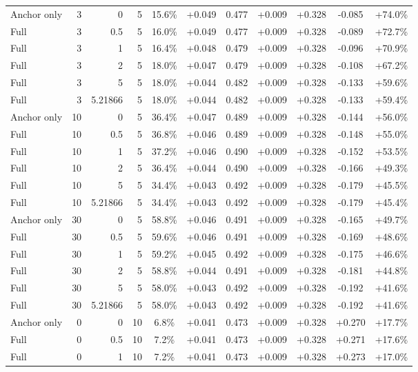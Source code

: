 \begin{table}[htbp]
\begin{tabular}{lrrrccccccc}
Anchor only & 3 & 0 & 5 & 15.6\% & +0.049 & 0.477 & +0.009 & +0.328 & -0.085 & +74.0\% \\
Full & 3 & 0.5 & 5 & 16.0\% & +0.049 & 0.477 & +0.009 & +0.328 & -0.089 & +72.7\% \\
Full & 3 & 1 & 5 & 16.4\% & +0.048 & 0.479 & +0.009 & +0.328 & -0.096 & +70.9\% \\
Full & 3 & 2 & 5 & 18.0\% & +0.047 & 0.479 & +0.009 & +0.328 & -0.108 & +67.2\% \\
Full & 3 & 5 & 5 & 18.0\% & +0.044 & 0.482 & +0.009 & +0.328 & -0.133 & +59.6\% \\
Full & 3 & 5.21866 & 5 & 18.0\% & +0.044 & 0.482 & +0.009 & +0.328 & -0.133 & +59.4\% \\
Anchor only & 10 & 0 & 5 & 36.4\% & +0.047 & 0.489 & +0.009 & +0.328 & -0.144 & +56.0\% \\
Full & 10 & 0.5 & 5 & 36.8\% & +0.046 & 0.489 & +0.009 & +0.328 & -0.148 & +55.0\% \\
Full & 10 & 1 & 5 & 37.2\% & +0.046 & 0.490 & +0.009 & +0.328 & -0.152 & +53.5\% \\
Full & 10 & 2 & 5 & 36.4\% & +0.044 & 0.490 & +0.009 & +0.328 & -0.166 & +49.3\% \\
Full & 10 & 5 & 5 & 34.4\% & +0.043 & 0.492 & +0.009 & +0.328 & -0.179 & +45.5\% \\
Full & 10 & 5.21866 & 5 & 34.4\% & +0.043 & 0.492 & +0.009 & +0.328 & -0.179 & +45.4\% \\
Anchor only & 30 & 0 & 5 & 58.8\% & +0.046 & 0.491 & +0.009 & +0.328 & -0.165 & +49.7\% \\
Full & 30 & 0.5 & 5 & 59.6\% & +0.046 & 0.491 & +0.009 & +0.328 & -0.169 & +48.6\% \\
Full & 30 & 1 & 5 & 59.2\% & +0.045 & 0.492 & +0.009 & +0.328 & -0.175 & +46.6\% \\
Full & 30 & 2 & 5 & 58.8\% & +0.044 & 0.491 & +0.009 & +0.328 & -0.181 & +44.8\% \\
Full & 30 & 5 & 5 & 58.0\% & +0.043 & 0.492 & +0.009 & +0.328 & -0.192 & +41.6\% \\
Full & 30 & 5.21866 & 5 & 58.0\% & +0.043 & 0.492 & +0.009 & +0.328 & -0.192 & +41.6\% \\
Anchor only & 0 & 0 & 10 & 6.8\% & +0.041 & 0.473 & +0.009 & +0.328 & +0.270 & +17.7\% \\
Full & 0 & 0.5 & 10 & 7.2\% & +0.041 & 0.473 & +0.009 & +0.328 & +0.271 & +17.6\% \\
Full & 0 & 1 & 10 & 7.2\% & +0.041 & 0.473 & +0.009 & +0.328 & +0.273 & +17.0\% \\

\end{tabular}
\end{table}
